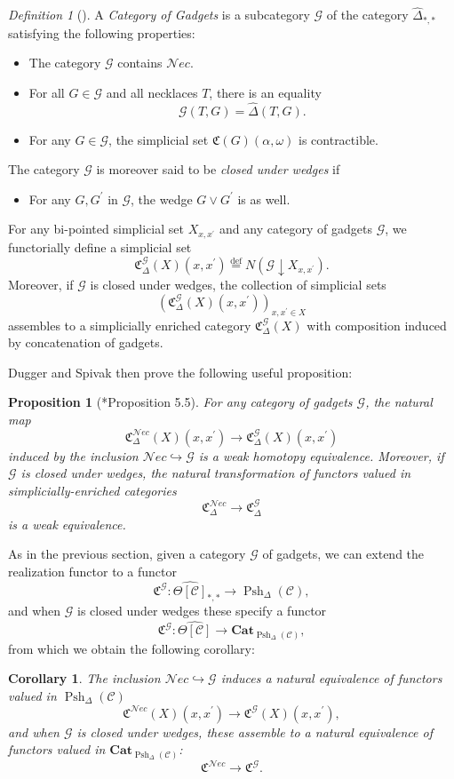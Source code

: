 \documentclass[leqno]{article}
\numberwithin{equation}{subsection}
\theoremstyle{plain}   %
\newtheorem{prop}[equation]{Proposition}
\newtheorem{cor}[equation]{Corollary}
\theoremstyle{remark}
\newtheorem{defn}[equation]{Definition}
\theoremstyle{plain}
\newcommand{\Nec}{\ensuremath{{\mathcal{N}ec}}}
\newcommand{\Cat}{\ensuremath{\mathbf{Cat}}}
\newcommand{\overcat}[2]{{\left(#1\downarrow #2\right)}}
\newcommand{\psh}[1]{\ensuremath{\widehat{#1}}}
\newcommand{\defeq}{\overset{\mathrm{def}}=}
\newcommand{\cellset}{\ensuremath{\widehat{\Theta[\mathcal{C}]}}}
\newcommand{\spsh}{\ensuremath{\operatorname{Psh}_\Delta(\mathcal{C})}}
\begin{document}
\begin{defn}[\cite{ds1}]
	A \emph{Category of Gadgets} is a subcategory \(\mathcal{G}\) of the category \(\psh{\Delta}_{\ast,\ast}\) satisfying the following properties:
	\begin{itemize}
		\item The category \(\mathcal{G}\) contains \(\Nec\).
		\item For all \(G\in \mathcal{G}\) and all necklaces \(T\), there is an equality 
		\[
			\mathcal{G}(T,G) = \psh{\Delta}(T,G).
		\]
		\item For any \(G \in \mathcal{G}\), the simplicial set \(\mathfrak{C}(G)(\alpha,\omega)\) is contractible.
	\end{itemize}
	The category \(\mathcal{G}\) is moreover said to be \emph{closed under wedges} if
	\begin{itemize}
		\item For any \(G, G^\prime\) in \(\mathcal{G}\), the wedge \(G\vee G^\prime\) is as well.
	\end{itemize}
	For any bi-pointed simplicial set \(X_{x,x^\prime}\) and any category of gadgets \(\mathcal{G}\), we functorially define a simplicial set 
	\[
		\mathfrak{C}^{\mathcal{G}}_\Delta(X)(x,x^\prime)\defeq N\overcat{\mathcal{G}}{X_{x,x^\prime}}.
	\]
	Moreover, if \(\mathcal{G}\) is closed under wedges, the collection of simplicial sets 
	\[
		(\mathfrak{C}^{\mathcal{G}}_\Delta(X)(x,x^\prime))_{x,x^\prime \in X}
	\]
	assembles to a simplicially enriched category \(\mathfrak{C}^{\mathcal{G}}_\Delta(X)\) with composition induced by concatenation of gadgets.
\end{defn}

Dugger and Spivak then prove the following useful proposition:

\begin{prop}[\cite{ds1}*{Proposition 5.5}]
	For any category of gadgets \(\mathcal{G}\), the natural map
	\[\mathfrak{C}^{\Nec}_\Delta(X)(x,x^\prime)\to \mathfrak{C}^{\mathcal{G}}_\Delta(X)(x,x^\prime)\]
	induced by the inclusion \(\Nec \hookrightarrow \mathcal{G}\) is a weak homotopy equivalence.  Moreover, if \(\mathcal{G}\) is closed under wedges, the natural transformation of functors valued in simplicially-enriched categories
	\[\mathfrak{C}^{\Nec}_\Delta\to \mathfrak{C}^{\mathcal{G}}_\Delta\]
	is a weak equivalence.
\end{prop}

As in the previous section, given a category \(\mathcal{G}\) of gadgets, we can extend the realization functor to a functor
\[
	\mathfrak{C}^\mathcal{G}:\cellset_{\ast,\ast} \to \spsh,
\]
and when \(\mathcal{G}\) is closed under wedges these specify a functor
\[
	\mathfrak{C}^\mathcal{G}:\cellset \to \Cat_{\spsh},
\]
from which we obtain the following corollary:
\begin{cor}\label{gadgetlemma}
	The inclusion \(\Nec\hookrightarrow \mathcal{G}\) induces a natural equivalence of functors valued in \(\spsh\)
	\[\mathfrak{C}^{\Nec}(X)(x,x^\prime)\to \mathfrak{C}^{\mathcal{G}}(X)(x,x^\prime),\]
	and when \(\mathcal{G}\) is closed under wedges, these assemble to a natural equivalence of functors valued in \(\Cat_{\spsh}\):
	\[\mathfrak{C}^{\Nec}\to \mathfrak{C}^{\mathcal{G}}.\]
\end{cor}
\end{document}
